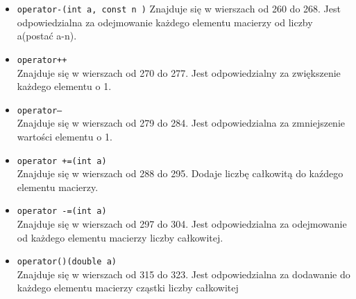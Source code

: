 \begin{itemize}
    \item \texttt{operator-(int a, const n	)}
    Znajduje się w wierszach od 260 do 268.
    Jest odpowiedzialna za odejmowanie każdego elementu macierzy od liczby a(postać a-n).
    
    \item \texttt{operator++}\\
    Znajduje się w wierszach od 270 do 277.
    Jest odpowiedzialny za zwiększenie każdego elementu o 1.
    
    \item \texttt{operator--}\\
    Znajduje się w wierszach od 279 do 284.
    Jest odpowiedzialna za zmniejszenie wartości elementu o 1.
    
    \item \texttt{operator +=(int a)}\\
    Znajduje się w wierszach od 288 do 295.
    Dodaje liczbę całkowitą do kaźdego elementu macierzy.
    
    \item \texttt{operator -=(int a)}\\
    Znajduje się w wierszach od 297 do 304.
    Jest odpowiedzialna za odejmowanie od każdego elementu macierzy liczby całkowitej.
    
    \item \texttt{operator()(double a)}\\
    Znajduje się w wierszach od 315 do 323.
    Jest odpowiedzialna za dodawanie do każdego elementu macierzy cząstki liczby całkowitej
\end{itemize}
